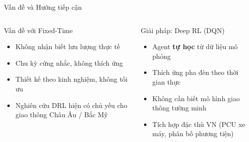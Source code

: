 \begin{frame}{Vấn đề và Hướng tiếp cận}
  \begin{columns}[T]
    \begin{alertblock}{Vấn đề với Fixed-Time}
      \begin{itemize}
        \item Không nhận biết lưu lượng thực tế
        \item Chu kỳ cứng nhắc, không thích ứng
        \item Thiết kế theo kinh nghiệm, không tối ưu
        \item Nghiên cứu DRL hiện có chủ yếu cho giao thông Châu Âu / Bắc Mỹ
      \end{itemize}
    \end{alertblock}

    \begin{exampleblock}{Giải pháp: Deep RL (DQN)}
      \begin{itemize}
        \item Agent \textbf{tự học} từ dữ liệu mô phỏng
        \item Thích ứng pha đèn theo thời gian thực
        \item Không cần biết mô hình giao thông tường minh
        \item Tích hợp đặc thù VN (PCU xe máy, phân bố phương tiện)
      \end{itemize}
    \end{exampleblock}
  \end{columns}

  \vspace{10pt}
  \begin{center}
  \end{center}
\end{frame}

